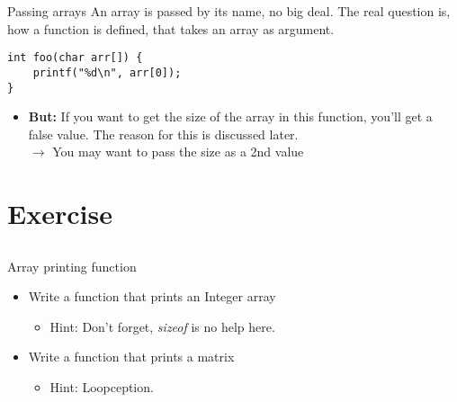 \begin{frame}[fragile]{Passing arrays}
	An array is passed by its name, no big deal. The real question is, how a function is defined, that takes an array as argument.
	\begin{lstlisting}[numbers=none]
int foo(char arr[]) {
	printf("%d\n", arr[0]);
}
\end{lstlisting}
	\begin{itemize}
		\item \textbf{But:} If you want to get the size of the array in this function, you'll get a false value. The reason for this is discussed later.\\
		$\rightarrow$ You may want to pass the size as a 2nd value
	\end{itemize}
\end{frame}
\section{Exercise}
\subsection{}
\begin{frame}{Array printing function}
	\begin{itemize}
		\item Write a function that prints an Integer array
		\begin{itemize}
			\item<2-> Hint: Don't forget, \textit{sizeof} is no help here.
		\end{itemize}
		\item Write a function that prints a matrix
		\begin{itemize}
			\item<3-> Hint: Loopception.
		\end{itemize}
	\end{itemize}
\end{frame}

